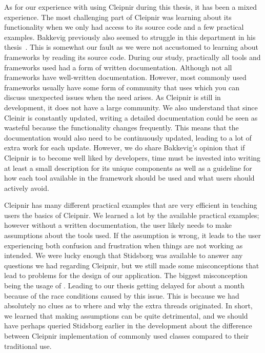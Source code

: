 As for our experience with using Cleipnir during this thesis, it has been a mixed experience. The most challenging part of Cleipnir was learning about its functionality when we only had access to its source code and a few practical examples. Bakkevig previously also seemed to struggle in this department in his thesis~\cite[p.~43-44]{PAPER:EivindPaper}. This is somewhat our fault as we were not accustomed to learning about frameworks by reading its source code. During our study, practically all tools and frameworks used had a form of written documentation. Although not all frameworks have well-written documentation. However, most commonly used frameworks usually have some form of community that uses which you can discuss unexpected issues when the need arises. As Cleipnir is still in development, it does not have a large community. We also understand that since Cleinir is constantly updated, writing a detailed documentation could be seen as wasteful because the functionality changes frequently. This means that the documentation would also need to be continuously updated, leading to a lot of extra work for each update. However, we do share Bakkevig’s opinion that if Cleipnir is to become well liked by developers, time must be invested into writing at least a small description for its unique components as well as a guideline for how each tool available in the framework should be used and what users should actively avoid. 

Cleipnir has many different practical examples that are very efficient in teaching users the basics of Cleipnir. We learned a lot by the available practical examples; however without a written documentation, the user likely needs to make assumptions about the tools used. If the assumption is wrong, it leads to the user experiencing both confusion and frustration when things are not working as intended. We were lucky enough that Stidsborg was available to answer any questions we had regarding Cleipnir, but we still made some misconceptions that lead to problems for the design of our application. The biggest misconception being the usage of . Leading to our thesis getting delayed for about a month because of the race conditions caused by this issue. This is because we had absolutely no clues as to where and why the extra threads originated.   In short, we learned that making assumptions can be quite detrimental, and we should have perhaps queried Stidsborg earlier in the development about the difference between Cleipnir implementation of commonly used classes compared to their traditional use. 
